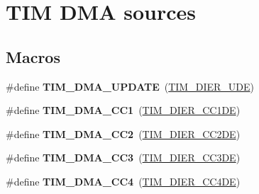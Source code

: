 \hypertarget{group___t_i_m___d_m_a__sources}{}\section{T\+IM D\+MA sources}
\label{group___t_i_m___d_m_a__sources}
\subsection*{Macros}
\begin{DoxyCompactItemize}
\item 
\#define {\bfseries T\+I\+M\+\_\+\+D\+M\+A\+\_\+\+U\+P\+D\+A\+TE}~(\hyperlink{group___peripheral___registers___bits___definition_gab9f47792b1c2f123464a2955f445c811}{T\+I\+M\+\_\+\+D\+I\+E\+R\+\_\+\+U\+DE})\hypertarget{group___t_i_m___d_m_a__sources_ga45816ad15a4f533027eb202ac0b9aaf5}{}\label{group___t_i_m___d_m_a__sources_ga45816ad15a4f533027eb202ac0b9aaf5}

\item 
\#define {\bfseries T\+I\+M\+\_\+\+D\+M\+A\+\_\+\+C\+C1}~(\hyperlink{group___peripheral___registers___bits___definition_gae181bb16ec916aba8ba86f58f745fdfd}{T\+I\+M\+\_\+\+D\+I\+E\+R\+\_\+\+C\+C1\+DE})\hypertarget{group___t_i_m___d_m_a__sources_ga33b93e8bb82fe8e167b9e9c962c54f83}{}\label{group___t_i_m___d_m_a__sources_ga33b93e8bb82fe8e167b9e9c962c54f83}

\item 
\#define {\bfseries T\+I\+M\+\_\+\+D\+M\+A\+\_\+\+C\+C2}~(\hyperlink{group___peripheral___registers___bits___definition_ga58f97064991095b28c91028ca3cca28e}{T\+I\+M\+\_\+\+D\+I\+E\+R\+\_\+\+C\+C2\+DE})\hypertarget{group___t_i_m___d_m_a__sources_ga792f73196a8e7424655592097d7a3fd5}{}\label{group___t_i_m___d_m_a__sources_ga792f73196a8e7424655592097d7a3fd5}

\item 
\#define {\bfseries T\+I\+M\+\_\+\+D\+M\+A\+\_\+\+C\+C3}~(\hyperlink{group___peripheral___registers___bits___definition_ga1567bff5dc0564b26a8b3cff1f0fe0a4}{T\+I\+M\+\_\+\+D\+I\+E\+R\+\_\+\+C\+C3\+DE})\hypertarget{group___t_i_m___d_m_a__sources_ga3eb2dadbd3109bced45935fb53deeee1}{}\label{group___t_i_m___d_m_a__sources_ga3eb2dadbd3109bced45935fb53deeee1}

\item 
\#define {\bfseries T\+I\+M\+\_\+\+D\+M\+A\+\_\+\+C\+C4}~(\hyperlink{group___peripheral___registers___bits___definition_gaaba034412c54fa07024e516492748614}{T\+I\+M\+\_\+\+D\+I\+E\+R\+\_\+\+C\+C4\+DE})\hypertarget{group___t_i_m___d_m_a__sources_ga59495cf79894dfe5e5b2029863aed956}{}\label{group___t_i_m___d_m_a__sources_ga59495cf79894dfe5e5b2029863aed956}


\end{DoxyCompactItemize}
